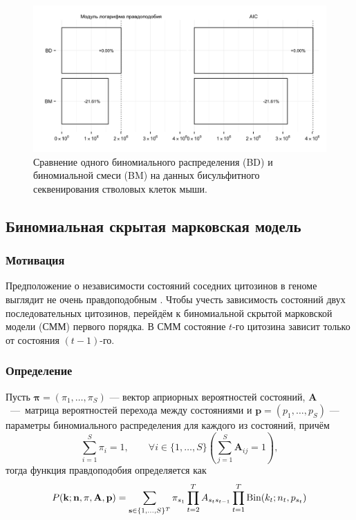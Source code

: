 \begin{figure}[h]
  \centering
  \includegraphics[width=\textwidth]{images/bd-bm}
  \caption{Сравнение одного биномиального распределения (BD) и биномиальной смеси (BM)
    на данных бисульфитного секвенирования стволовых клеток мыши.}
  \label{fig:bd-bm}
\end{figure}


\subsection{Биномиальная скрытая марковская модель}

\subsubsection{Мотивация}

Предположение о независимости состояний соседних цитозинов в геноме выглядит
не очень правдоподобным \cite{Saxonov2006}. Чтобы учесть зависимость состояний двух последовательных
цитозинов, перейдём к биномиальной скрытой марковской модели (СММ) первого порядка.
В СММ состояние $t$-го цитозина зависит только от состояния $(t-1)$-го.

\subsubsection{Определение}

Пусть $\mathbf{\pi} = (\pi_1, \ldots, \pi_S)$ --- вектор априорных
вероятностей состояний, $\mathbf{A}$~---~матрица вероятностей перехода между
состояниями и $\mathbf{p} = (p_1, \ldots, p_S)$ --- параметры биномиального
распределения для каждого из состояний, причём
$$
\sum\limits_{i = 1}^S \pi_i = 1,
\qquad
\forall i \in \{1, \ldots, S\}
\left( \sum\limits_{j = 1}^S \mathbf{A}_{ij} = 1  \right),
$$
тогда функция правдоподобия определяется как
$$
P(\mathbf{k}; \mathbf{n}, \mathbf{\pi}, \mathbf{A}, \mathbf{p})
= \sum\limits_{\mathbf{s} \in \{1, \ldots, S\}^T}
  \pi_{s_1}
  \prod\limits_{t = 2}^T A_{s_t s_{t - 1}}
  \prod\limits_{t = 1}^T \operatorname{Bin}(k_t; n_t, p_{s_t})
$$

